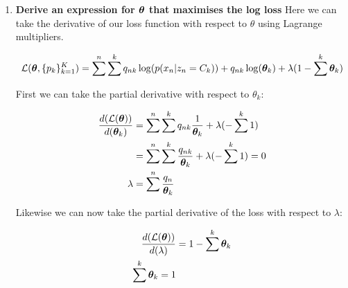 \documentclass[submit]{harvardml}
\begin{document}
\begin{enumerate}
\begin{enumerate}
        \item \textbf{Derive an expression for $\boldsymbol{\theta}$ that maximises the log loss}
        Here we can take the derivative of our loss function with respect to $\theta$ using Lagrange multipliers.
        
        \begin{align*}
            \mathcal{L}(\boldsymbol{\theta}, \{p_k\}^K_{k=1}) &= \sum^n \sum^k q_{nk}  \log  ( p(x_n| z_n = C_k)) + q_{nk}  \log( \boldsymbol{\theta}_k) + \lambda (1 - \sum^k \boldsymbol{\theta}_k)\\
        \end{align*}
        
        First we can take the partial derivative with respect to $\theta_k$:
        
        \begin{align*}
            \frac{d(\mathcal{L}(\boldsymbol{\theta}))}{d(\boldsymbol{\theta}_k)} &= \sum^n \sum^k q_{nk} \frac{1}{\boldsymbol{\theta}_k} + \lambda(-\sum^k 1)\\
            &= \sum^n \sum^k \frac{q_{nk}}{\boldsymbol{\theta}_k} + \lambda(-\sum^k 1) = 0 \\
            \lambda &= \sum^n \frac{q_{n}}{\boldsymbol{\theta}_k}
        \end{align*}
        
        Likewise we can now take the partial derivative of the loss with respect to $\lambda$:
        
        \begin{align*}
            \frac{d(\mathcal{L}(\boldsymbol{\theta}))}{d(\lambda)} &= 1 - \sum^k \boldsymbol{\theta}_k\\
            \sum^k \boldsymbol{\theta}_k = 1
        \end{align*}
        

\end{enumerate}
\end{enumerate}
\end{document}
